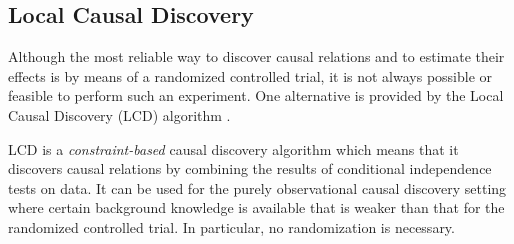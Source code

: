\subsection{Local Causal Discovery}
Although the most reliable way to discover causal relations and to estimate their effects
is by means of a randomized controlled trial, it is not always possible or feasible to 
perform such an experiment. One alternative is provided by the Local Causal Discovery
(LCD) algorithm \cite{Cooper1997}.

LCD is a \emph{constraint-based} causal discovery algorithm which means that it discovers
causal relations by combining the results of conditional independence tests on data.
It can be used for the purely observational causal discovery setting where certain background knowledge is available
that is weaker than that for the randomized controlled trial. In particular, no randomization is necessary.

